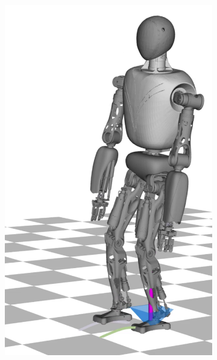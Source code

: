 \begin{figure}
\begin{subfigure}{.16\textwidth}
	\includegraphics[width=.95\linewidth]{fig/walkDynamic/snaps/3}
	\caption{}
\end{subfigure}%
\begin{subfigure}{.16\textwidth}

\end{subfigure}
\end{figure}
